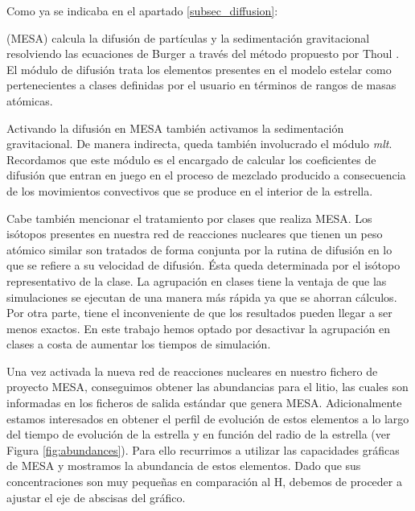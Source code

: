 Como ya se indicaba en el apartado \ref{subsec_diffusion}:
\begin{center}
    \begin{minipage}{0.9\linewidth}
        \vspace{5pt}%
        {\small
        (MESA) calcula la difusión de partículas y la sedimentación gravitacional resolviendo las ecuaciones de Burger a través del método propuesto por Thoul \citep{Thoul1993}. El módulo de difusión trata los elementos presentes en el modelo estelar como pertenecientes a clases definidas por el usuario en términos de rangos de masas atómicas.
        }
        \vspace{5pt}%
    \end{minipage}
\end{center}

Activando la difusión en MESA también activamos la sedimentación gravitacional. De manera indirecta, queda también involucrado el módulo \textit{mlt}. Recordamos que este módulo es el encargado de calcular los coeficientes de difusión que entran en juego en el proceso de mezclado producido a consecuencia de los movimientos convectivos que se produce en el interior de la estrella.\par

Cabe también mencionar el tratamiento por clases que realiza MESA. Los isótopos presentes en nuestra red de reacciones nucleares que tienen un peso atómico similar son tratados de forma conjunta por la rutina de difusión en lo que se refiere a su velocidad de difusión. Ésta queda determinada por el isótopo representativo de la clase. La agrupación en clases tiene la ventaja de que las simulaciones se ejecutan de una manera más rápida ya que se ahorran cálculos. Por otra parte, tiene el inconveniente de que los resultados pueden llegar a ser menos exactos. En este trabajo hemos optado por desactivar la agrupación en clases a costa de aumentar los tiempos de simulación.\par

Una vez activada la nueva red de reacciones nucleares en nuestro fichero de proyecto MESA, conseguimos obtener las abundancias para el litio, las cuales son informadas en los ficheros de salida estándar que genera MESA. Adicionalmente estamos interesados en obtener el perfil de evolución de estos elementos a lo largo del tiempo de evolución de la estrella y en función del radio de la estrella (ver Figura \ref{fig:abundances}). Para ello recurrimos a utilizar las capacidades gráficas de MESA y mostramos la abundancia de estos elementos. Dado que sus concentraciones son muy pequeñas en comparación al H, debemos de proceder a ajustar el eje de abscisas del gráfico.\par

